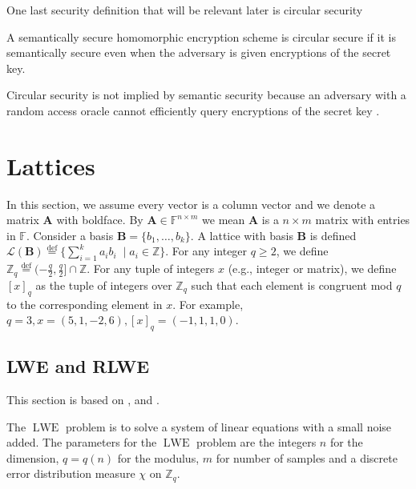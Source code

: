 One last security definition that will be relevant later is circular security
\begin{definition}
    A semantically secure homomorphic encryption scheme is circular secure if it is semantically secure even when the adversary is given encryptions of the secret key.
\end{definition}
\begin{remark}
    Circular security is not implied by semantic security because an adversary with a random access oracle cannot efficiently query encryptions of the secret key \cite{Bra18-survey}.
\end{remark}

\section{Lattices}

In this section, we assume every vector is a column vector and we denote a matrix $\textbf{A}$ with boldface. By $\textbf{A} \in \mathbb{F}^{n \times m}$ we mean $\textbf{A}$ is a $n \times m$ matrix with entries in $\mathbb{F}$. Consider a basis $\textbf{B} = \{b_1, \dots, b_k\}$. A lattice with basis $\textbf{B}$ is defined $\mathcal{L}(\textbf{B}) \stackrel{\mathrm{def}}{=} \{ \sum_{i=1}^k a_i b_i \; \mid a_i \in \mathbb{Z}\}$. For any integer $q \geq 2$, we define $\mathbb{Z}_q \stackrel{\mathrm{def}}{=} (-\frac{q}{2}, \frac{q}{2}] \cap \mathbb{Z}$. For any tuple of integers $x$ (e.g., integer or matrix), we define $[x]_q$ as the tuple of integers over $\mathbb{Z}_q$ such that each element is congruent mod $q$ to the corresponding element in $x$. For example, $q = 3, x = (5,1,-2,6), [x]_q = (-1,1,1,0)$.

\subsection*{LWE and RLWE}\label{subsec:LWE}
This section is based on \cite{Hal18}, \cite{LNP22} and \cite{Pei16-decade}.

The $\operatorname{LWE}$ problem is to solve a system of linear equations with a small noise added.
The parameters for the $\operatorname{LWE}$ problem are the integers $n$ for the dimension, $q = q(n)$ for the modulus, $m$ for number of samples and a discrete error distribution measure $\chi$ on $\mathbb{Z}_q$.


